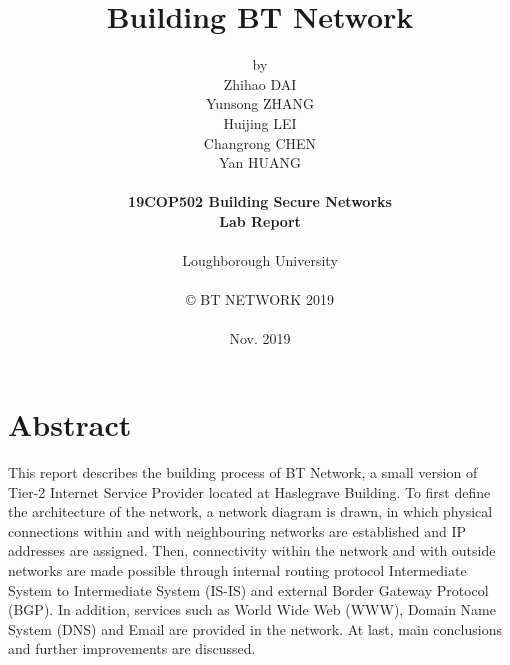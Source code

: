 \title{\bf Building BT Network}

\author{by\\
Zhihao DAI\\
Yunsong ZHANG\\
Huijing LEI\\
Changrong CHEN\\
Yan HUANG\\
\\
{\bf 19COP502 Building Secure Networks}\\
{\bf Lab Report}\\
\\
Loughborough University\\
\\
\copyright
\hspace{1 dd} BT NETWORK 2019\\
\\
Nov. 2019
}
\date{} %

\maketitle


% 
% 

\chapter*{Abstract}
This report describes the building process of BT Network, a small version of Tier-2 Internet Service Provider located at Haslegrave Building.
To first define the architecture of the network, a network diagram is drawn, in which physical connections within and with neighbouring networks are established and IP addresses are assigned. 
Then, connectivity within the network and with outside networks are made possible through internal routing protocol Intermediate System to Intermediate System (IS-IS) and external Border Gateway Protocol (BGP).
In addition, services such as World Wide Web (WWW), Domain Name System (DNS) and Email are provided in the network.
At last, main conclusions and further improvements are discussed.

